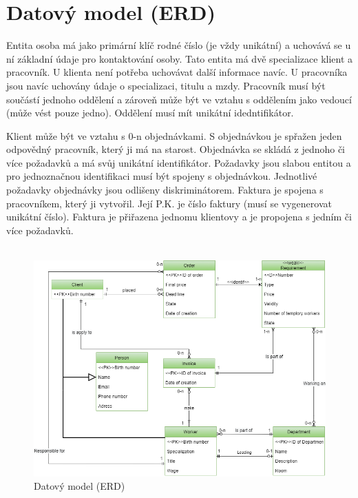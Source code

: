 \documentclass[11pt, a4paper]{article}
\begin{document}
    \section{Datový model (ERD)}
    \qquad Entita osoba má jako primární klíč rodné číslo (je vždy unikátní) a uchovává se u ní základní údaje pro kontaktování osoby. Tato entita má dvě specializace klient a pracovník. U klienta není potřeba uchovávat další informace navíc. U pracovníka jsou navíc uchovány údaje o specializaci, titulu a mzdy. Pracovník musí být součástí jednoho oddělení a zároveň může být ve vztahu s oddělením jako vedoucí (může vést pouze jedno). Oddělení musí mít unikátní idedntifikátor. \par 
    Klient může být ve vztahu s 0-n objednávkami. S objednávkou je spřažen jeden odpovědný pracovník, který ji má na starost. Objednávka se skládá z jednoho či více požadavků a má svůj unikátní identifikátor. Požadavky jsou slabou entitou a pro jednoznačnou identifikaci musí být spojeny s objednávkou. Jednotlivé požadavky objednávky jsou odlišeny diskriminátorem. Faktura je spojena s pracovníkem, který ji vytvořil. Její P.K. je číslo faktury (musí se vygenerovat unikátní číslo). Faktura je přiřazena jednomu klientovy a je propojena s jedním či více požadavků.\\\\

	\begin{figure}[ht]
		\centering

		\includegraphics[width=1 \linewidth]{er_diagram.png}
		\caption{Datový model (ERD)}
	\end{figure}
\end{document}
